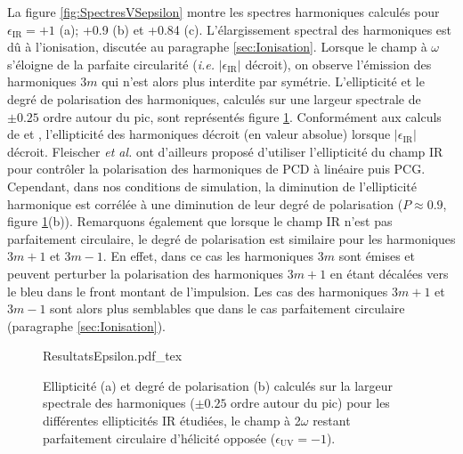 La figure \ref{fig:SpectresVSepsilon} montre les spectres harmoniques calculés pour $\epsilon_{\text{IR}} = +1$ (a); +0.9 (b) et +0.84 (c). L'élargissement spectral des harmoniques est dû à l'ionisation, discutée au paragraphe \ref{sec:Ionisation}. Lorsque le champ à $\omega$ s'éloigne de la parfaite circularité (\textit{i.e.} $|\epsilon_{\text{IR}}|$ décroit), on observe l'émission des harmoniques $3m$ qui  n'est alors plus interdite par symétrie. L'ellipticité et le degré de polarisation des harmoniques, calculés sur une largeur spectrale de $\pm 0.25$ ordre autour du pic, sont représentés figure \ref{fig:ResultatsEpsilon}. Conformément aux calculs de  et  , l'ellipticité des harmoniques décroit (en valeur absolue) lorsque $|\epsilon_{\text{IR}}|$ décroit. Fleischer \textit{et al.} ont d'ailleurs proposé d'utiliser l'ellipticité du champ IR pour contrôler la polarisation des harmoniques de PCD à linéaire puis PCG. Cependant, dans nos conditions de simulation, la diminution de l'ellipticité harmonique est corrélée à une diminution de leur degré de polarisation ($P \approx 0.9$, figure \ref{fig:ResultatsEpsilon}(b)). Remarquons également que lorsque le champ IR n'est pas parfaitement circulaire, le degré de polarisation est similaire pour les harmoniques $3m+1$ et $3m-1$. En effet, dans ce cas les harmoniques $3m$ sont émises et peuvent perturber la polarisation des harmoniques $3m+1$ en étant décalées vers le bleu dans le front montant de l'impulsion. Les cas des harmoniques $3m+1$ et $3m-1$ sont alors plus semblables que dans le cas parfaitement circulaire (paragraphe \ref{sec:Ionisation}).

\begin{figure}
\centering
\def\svgwidth{\textwidth}
{ResultatsEpsilon.pdf_tex}
\caption{Ellipticité (a) et degré de polarisation (b) calculés sur la largeur spectrale des harmoniques ($\pm 0.25$ ordre autour du pic) pour les différentes ellipticités IR étudiées, le champ à 2$\omega$ restant parfaitement circulaire d'hélicité opposée ($\epsilon_{\text{UV}} = -1$).}
\label{fig:ResultatsEpsilon}
\end{figure}

